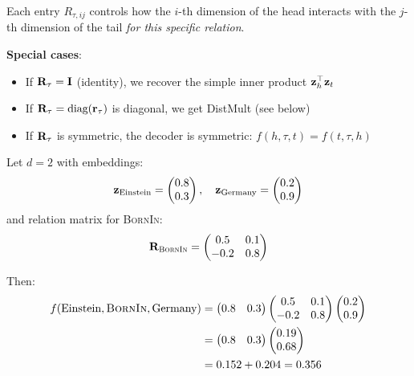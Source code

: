 \begin{notechapter}
\begin{mathbox}
Each entry $R_{\tau,ij}$ controls how the $i$-th dimension of the head interacts with the $j$-th dimension of the tail \emph{for this specific relation}.

\textbf{Special cases}:
\begin{itemize}
    \item If $\mathbf{R}_\tau = \mathbf{I}$ (identity), we recover the simple inner product $\mathbf{z}_h^\top \mathbf{z}_t$
    \item If $\mathbf{R}_\tau = \text{diag}(\mathbf{r}_\tau)$ is diagonal, we get DistMult (see below)
    \item If $\mathbf{R}_\tau$ is symmetric, the decoder is symmetric: $f(h, \tau, t) = f(t, \tau, h)$
\end{itemize}
\end{mathbox}

\begin{example}
Let $d = 2$ with embeddings:
\[
\mathbf{z}_{\text{Einstein}} = \begin{pmatrix} 0.8 \\ 0.3 \end{pmatrix}, \quad
\mathbf{z}_{\text{Germany}} = \begin{pmatrix} 0.2 \\ 0.9 \end{pmatrix}
\]
and relation matrix for \textsc{BornIn}:
\[
\mathbf{R}_{\textsc{BornIn}} = \begin{pmatrix} 0.5 & 0.1 \\ -0.2 & 0.8 \end{pmatrix}
\]

Then:
\begin{align*}
f(\text{Einstein}, \textsc{BornIn}, \text{Germany}) &= \begin{pmatrix} 0.8 & 0.3 \end{pmatrix} 
\begin{pmatrix} 0.5 & 0.1 \\ -0.2 & 0.8 \end{pmatrix}
\begin{pmatrix} 0.2 \\ 0.9 \end{pmatrix} \\
&= \begin{pmatrix} 0.8 & 0.3 \end{pmatrix} \begin{pmatrix} 0.19 \\ 0.68 \end{pmatrix} \\
&= 0.152 + 0.204 = 0.356
\end{align*}


\end{example}
\end{notechapter}
